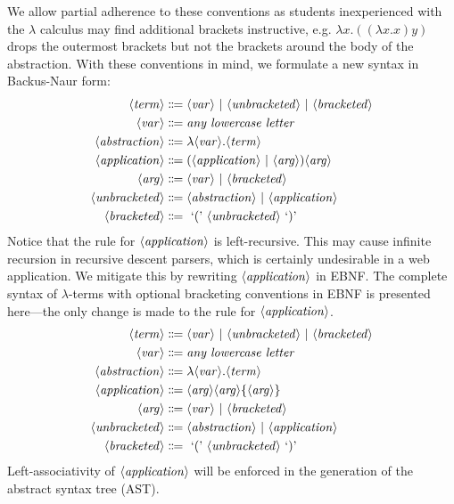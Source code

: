 We allow partial adherence to these conventions as students inexperienced with the $\lambda$ calculus may find additional brackets instructive, e.g. $\lambda x. ((\lambda x. x) y)$ drops the outermost brackets but not the brackets around the body of the abstraction. With these conventions in mind, we formulate a new syntax in Backus-Naur form:
\begin{align*}
    \langle\mathit{term}\rangle &\Coloneqq \langle\mathit{var}\rangle \ |\  \langle\mathit{unbracketed}\rangle \ |\  \langle\mathit{bracketed}\rangle \\
    \langle\mathit{var}\rangle  &\Coloneqq \textit{any lowercase letter} \\
    \langle\mathit{abstraction}\rangle &\Coloneqq \lambda \langle\mathit{var}\rangle. \langle\mathit{term}\rangle \\
    \langle\mathit{application}\rangle &\Coloneqq (\langle\mathit{application}\rangle \ |\  \langle\mathit{arg}\rangle) \langle\mathit{arg}\rangle \\
    \langle\mathit{arg}\rangle &\Coloneqq \langle\mathit{var}\rangle \ |\  \langle\mathit{bracketed}\rangle \\
    \langle\mathit{unbracketed}\rangle &\Coloneqq \langle\mathit{abstraction}\rangle \ |\  \langle\mathit{application}\rangle \\
    \langle\mathit{bracketed}\rangle &\Coloneqq \text{ `(' } \langle\mathit{unbracketed}\rangle \text{ `)' }
\end{align*}
Notice that the rule for $\langle\mathit{application}\rangle$ is left-recursive. This may cause infinite recursion in recursive descent parsers, which is certainly undesirable in a web application. We mitigate this by rewriting $\langle\mathit{application}\rangle$ in EBNF. The complete syntax of $\lambda$-terms with optional bracketing conventions in EBNF is presented here---the only change is made to the rule for $\langle\mathit{application}\rangle$.
\begin{align*}
    \langle\mathit{term}\rangle &\Coloneqq \langle\mathit{var}\rangle \ |\  \langle\mathit{unbracketed}\rangle \ |\  \langle\mathit{bracketed}\rangle \\
    \langle\mathit{var}\rangle  &\Coloneqq \textit{any lowercase letter} \\
    \langle\mathit{abstraction}\rangle &\Coloneqq \lambda \langle\mathit{var}\rangle. \langle\mathit{term}\rangle \\
    \langle\mathit{application}\rangle &\Coloneqq \langle\mathit{arg}\rangle \langle\mathit{arg}\rangle \{\langle\mathit{arg}\rangle\} \\
    \langle\mathit{arg}\rangle &\Coloneqq \langle\mathit{var}\rangle \ |\  \langle\mathit{bracketed}\rangle \\
    \langle\mathit{unbracketed}\rangle &\Coloneqq \langle\mathit{abstraction}\rangle \ |\  \langle\mathit{application}\rangle \\
    \langle\mathit{bracketed}\rangle &\Coloneqq \text{ `(' } \langle\mathit{unbracketed}\rangle \text{ `)' }
\end{align*}
Left-associativity of $\langle\mathit{application}\rangle$ will be enforced in the generation of the abstract syntax tree (AST).

